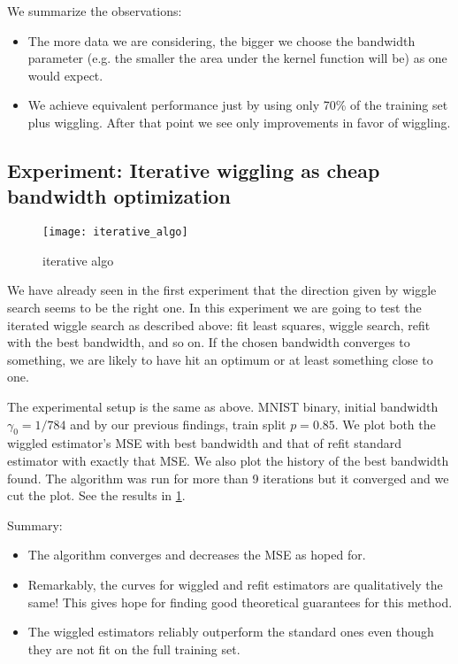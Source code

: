 \documentclass[12pt]{amsart}
\begin{document}
We summarize the observations:
\begin{itemize}
    \item The more data we are considering, the bigger we choose the 
        bandwidth parameter (e.g. the smaller the area under the kernel
        function will be) as one would expect.
    \item We achieve equivalent performance just by using only 70\% of the
        training set plus wiggling.
        After that point we see only improvements in favor of wiggling.
\end{itemize}

\subsection{Experiment: Iterative wiggling as cheap bandwidth optimization}

\begin{figure}[htp]
    \centering
    \texttt{[image: iterative\_algo]}
    \caption{iterative algo}
    \label{fig:iterative_algo}
\end{figure}

We have already seen in the first experiment that the direction given by
wiggle search seems to be the right one.
In this experiment we are going to test the iterated wiggle search as 
described above: fit least squares, wiggle search, refit with the best bandwidth, 
and so on.
If the chosen bandwidth converges to something, we are likely to have hit an 
optimum or at least something close to one.

The experimental setup is the same as above.
MNIST binary, initial bandwidth $\gamma_0 = 1/784$ and by our previous 
findings, train split $p = 0.85$.
We plot both the wiggled estimator's MSE with best bandwidth and that 
of refit standard estimator with exactly that MSE.
We also plot the history of the best bandwidth found.
The algorithm was run for more than 9 iterations but it converged 
and we cut the plot.
See the results in \cref{fig:iterative_algo}.

Summary:
\begin{itemize}
    \item The algorithm converges and decreases the MSE as hoped for.
    \item Remarkably, the curves for wiggled and refit estimators are
        qualitatively the same! 
        This gives hope for finding good theoretical guarantees for this
        method.
    \item The wiggled estimators reliably outperform the standard ones
        even though they are not fit on the full training set.
\end{itemize}
\end{document}
